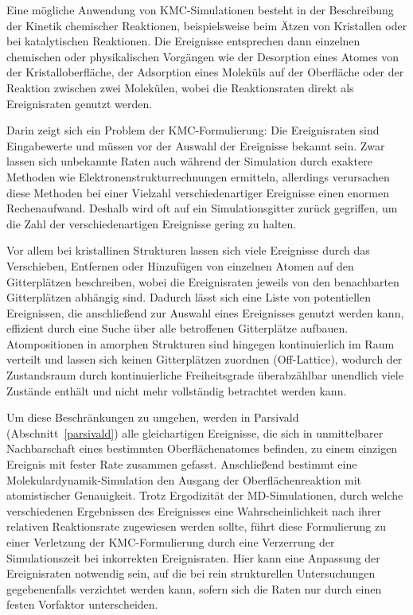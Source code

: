 Eine mögliche Anwendung von KMC-Simulationen besteht in der Beschreibung der Kinetik chemischer Reaktionen, beispielsweise beim Ätzen von Kristallen\cite{gosalvez_atomistic_2008} oder bei katalytischen Reaktionen\cite{stamatakis_unraveling_2012}.
Die Ereignisse entsprechen dann einzelnen chemischen oder physikalischen Vorgängen wie der Desorption eines Atomes von der Kristalloberfläche, der Adsorption eines Moleküls auf der Oberfläche oder der Reaktion zwischen zwei Molekülen, wobei die Reaktionsraten direkt als Ereignisraten genutzt werden.

Darin zeigt sich ein Problem der KMC-Formulierung:
Die Ereignisraten sind Eingabewerte und müssen vor der Auswahl der Ereignisse bekannt sein.
Zwar lassen sich unbekannte Raten auch während der Simulation durch exaktere Methoden wie Elektronenstrukturrechnungen ermitteln\cite{stamatakis_unraveling_2012}, allerdings verursachen diese Methoden bei einer Vielzahl verschiedenartiger Ereignisse einen enormen Rechenaufwand.
Deshalb wird oft auf ein Simulationsgitter zurück gegriffen, um die Zahl der verschiedenartigen Ereignisse gering zu halten.

Vor allem bei kristallinen Strukturen lassen sich viele Ereignisse durch das Verschieben, Entfernen oder Hinzufügen von einzelnen Atomen auf den Gitterplätzen beschreiben, wobei die Ereignisraten jeweils von den benachbarten Gitterplätzen abhängig sind.
Dadurch lässt sich eine Liste von potentiellen Ereignissen, die anschließend zur Auswahl eines Ereignisses genutzt werden kann, effizient durch eine Suche über alle betroffenen Gitterplätze aufbauen.
Atompositionen in amorphen Strukturen sind hingegen kontinuierlich im Raum verteilt und lassen sich keinen Gitterplätzen zuordnen (Off-Lattice), wodurch der Zustandsraum durch kontinuierliche Freiheitsgrade überabzählbar unendlich viele Zustände enthält und nicht mehr vollständig betrachtet werden kann.

Um diese Beschränkungen zu umgehen, werden in Parsivald (Abschnitt~\ref{parsivald}) alle gleichartigen Ereignisse, die sich in unmittelbarer Nachbarschaft eines bestimmten Oberflächenatomes befinden, zu einem einzigen Ereignis mit fester Rate zusammen gefasst.
Anschließend bestimmt eine Molekulardynamik-Simulation den Ausgang der Oberflächenreaktion mit atomistischer Genauigkeit.
Trotz Ergodizität der MD-Simulationen, durch welche verschiedenen Ergebnissen des Ereignisses eine Wahrscheinlichkeit nach ihrer relativen Reaktionsrate zugewiesen werden sollte, führt diese Formulierung zu einer Verletzung der KMC-Formulierung durch eine Verzerrung der Simulationszeit bei inkorrekten Ereignisraten.
Hier kann eine Anpassung der Ereignisraten notwendig sein, auf die bei rein strukturellen Untersuchungen gegebenenfalls verzichtet werden kann, sofern sich die Raten nur durch einen festen Vorfaktor unterscheiden.

